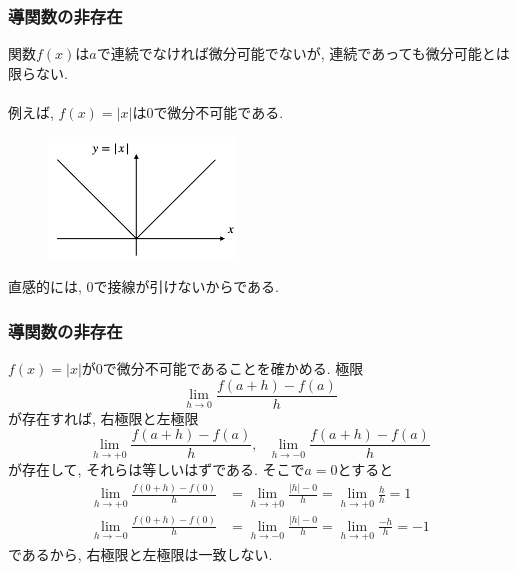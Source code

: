 \documentclass[dvipdfmx,cjk,10.2pt]{beamer}
\theoremstyle{definition}
\begin{document}
\begin{frame}
\frametitle{導関数の非存在}

関数$f(x)$は$a$で連続でなければ微分可能でないが, 連続であっても微分可能とは限らない. \\
\ \\

例えば, $f(x)=|x|$は$0$で微分不可能である. 

 \begin{figure}[htbp]
 \begin{center} 
  \includegraphics[width=50mm]{abs.png}
 \end{center}
\end{figure}

直感的には, $0$で接線が引けないからである. 

\end{frame}




\begin{frame}
\frametitle{導関数の非存在}


$f(x)=|x|$が$0$で微分不可能であることを確かめる. 
極限
$$
\lim_{h\to 0} \frac{f(a+h)-f(a)}{h}
$$
が存在すれば, 右極限と左極限
$$
\lim_{h\to +0} \frac{f(a+h)-f(a)}{h}, \ \ \ \lim_{h\to -0} \frac{f(a+h)-f(a)}{h}
$$
が存在して, それらは等しいはずである. 
そこで$a=0$とすると
\begin{align*}
\lim_{h\to +0} \frac{f(0+h)-f(0)}{h} & = 
\lim_{h\to +0} \frac{|h|-0}{h}=\lim_{h\to +0} \frac{h}{h}=1 \\
\lim_{h\to -0} \frac{f(0+h)-f(0)}{h} & = 
\lim_{h\to -0} \frac{|h|-0}{h}=\lim_{h\to +0} \frac{-h}{h}=-1
\end{align*}
であるから, 右極限と左極限は一致しない. 
\end{frame}



\end{document}
